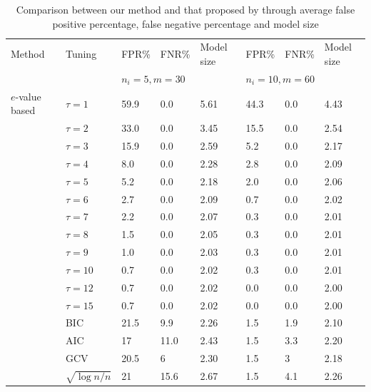 \begin{table}[t]
	\centering
	\begin{scriptsize}
   \begin{tabular}{ll|lll|lll}
    \hline
    Method      & Tuning     & FPR\% & FNR\% & Model size & FPR\% & FNR\% & Model size \\ \cline{3-8}
    ~ & ~ & \multicolumn{3}{l|}{$n_i=5,m=30$} & \multicolumn{3}{l}{$n_i=10,m=60$}\\ \hline
  $e$-value based       & $\tau=1$      & 59.9     & 0.0   & 5.61       & 44.3     & 0.0   & 4.43       \\
    ~      & $\tau=2$      & 33.0     & 0.0   & 3.45       & 15.5     & 0.0   & 2.54       \\
    ~      & $\tau=3$      & 15.9     & 0.0   & 2.59       & 5.2      & 0.0   & 2.17       \\
    ~      & $\tau=4$      & 8.0      & 0.0   & 2.28       & 2.8      & 0.0   & 2.09       \\
    ~      & $\tau=5$      & 5.2     & 0.0   & 2.18       & 2.0   & 0.0   & 2.06       \\
    ~      & $\tau=6$      & 2.7     & 0.0   & 2.09       & 0.7   & 0.0   & 2.02       \\
    ~      & $\tau=7$      & 2.2   & 0.0   & 2.07       & 0.3   & 0.0   & 2.01       \\
    ~      & $\tau=8$      & 1.5   & 0.0   & 2.05       & 0.3   & 0.0   & 2.01       \\
    ~      & $\tau=9$      & 1.0   & 0.0   & 2.03       & 0.3   & 0.0   & 2.01       \\
    ~      & $\tau=10$      & 0.7   & 0.0   & 2.02       & 0.3   & 0.0   & 2.01       \\
    ~      & $\tau=12$      & 0.7   & 0.0   & 2.02       & 0.0   & 0.0   & 2.00       \\
    ~      & $\tau=15$      & 0.7   & 0.0   & 2.02       & 0.0   & 0.0   & 2.00       \\
     \hline
    \cite{PengLu12} & BIC    & 21.5  & 9.9   & 2.26       & 1.5   & 1.9   & 2.10       \\
    ~      & AIC    & 17    & 11.0  & 2.43       & 1.5   & 3.3   & 2.20       \\
    ~      & GCV    & 20.5  & 6     & 2.30       & 1.5   & 3     & 2.18       \\
    ~      & $\sqrt{\log n/n}$ & 21    & 15.6  & 2.67       & 1.5   & 4.1   & 2.26       \\ \hline
    \end{tabular}
    \caption{Comparison between our method and that proposed by \cite{PengLu12} through average false positive percentage, false negative percentage and model size}
    \label{table:simtable1}
    \end{scriptsize}
\end{table}
